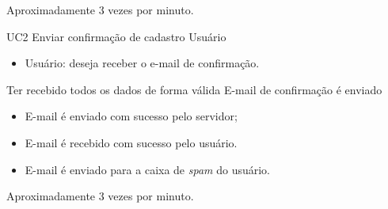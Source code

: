 {Aproximadamente 3 vezes por minuto.}
{

}


\casoDeUso
{UC2}
{Enviar confirmação de cadastro}
{Usuário}
{
\begin{itemize}
	\item Usuário: deseja receber o e-mail de confirmação.
\end{itemize}

}
{Ter recebido todos os dados de forma válida}
{E-mail de confirmação é enviado}
{
\begin{itemize}
	\item E-mail é enviado com sucesso pelo servidor;
	\item E-mail é recebido com sucesso pelo usuário.	
\end{itemize}
}
{
\begin{itemize}
\item E-mail é enviado para a caixa de \textit{spam} do usuário.
\end{itemize}
}
{Aproximadamente 3 vezes por  minuto.}
{
 
}


